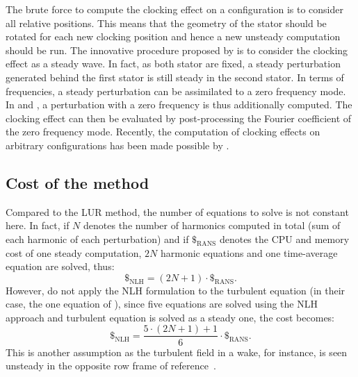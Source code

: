 The brute force to compute the clocking effect on a
configuration is to consider all relative positions. This means
that the geometry of the stator should be rotated for each new 
clocking position and hence a new unsteady computation should be 
run. The innovative procedure proposed by 
\citet{He2002} is to consider the clocking effect as a steady wave.
In fact, as both stator are fixed, a steady perturbation
generated behind the first stator is still steady in the second stator.
In terms of frequencies, a steady perturbation
can be assimilated to a zero frequency mode. 
In \citet{He2002} and \citet{Vilmin2009}, 
a perturbation with a zero frequency
is thus additionally computed. The clocking effect can then be evaluated by
post-processing the Fourier coefficient of the zero frequency mode.
Recently, the computation of clocking effects on
arbitrary configurations has been made possible
by \citet{Vilmin2013a}.

\subsection{Cost of the method}
Compared to the LUR method, the number of equations to solve is 
not constant here. In fact, if $N$ denotes the number of harmonics
computed in total (sum of each harmonic of each perturbation)
and if $\mathdollar_{\text{RANS}}$ 
denotes the CPU and memory cost of
one steady computation, $2N$ harmonic equations and 
one time-average equation
are solved, thus:
\begin{equation}
	\mathdollar_{\text{NLH}} = (2N+1) \cdot \mathdollar_{\text{RANS}}.
\end{equation}
However, \citet{Vilmin2006} do not apply the NLH formulation
to the turbulent equation (in their case, 
the one equation of \citet{Spalart1992}),
since five equations are solved using the NLH approach and turbulent equation
is solved as a steady one,
the cost becomes:
\begin{equation}
	\mathdollar_{\text{NLH}} = \frac{5 \cdot (2N+1) + 1}{6} \cdot \mathdollar_{\text{RANS}}.
\end{equation}
This is another assumption as the turbulent field in a wake,
for instance, is seen unsteady in the opposite row frame
of reference~\cite{Lakshminarayana1980}.
